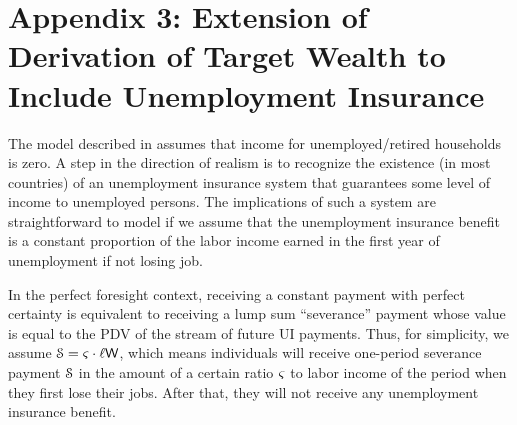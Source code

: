 

\section*{Appendix 3: Extension of Derivation of Target Wealth to Include Unemployment Insurance}

The model described in \cite{ctDiscrete} assumes that income for
unemployed/retired households is zero.  A step in the direction of
realism is to recognize the existence (in most countries) of an unemployment
insurance system that guarantees some level of income to unemployed
persons.  The implications of such a system are straightforward to
model if we assume that the unemployment insurance benefit is a
constant proportion of the labor income earned in the first year of unemployment if not losing job.

In the perfect foresight context, receiving a constant payment with
perfect certainty is equivalent to receiving a lump sum ``severance''
payment whose value is equal to the PDV of the stream of future UI
payments.  Thus, for simplicity, we assume
$\mathcal{S}=\varsigma\cdot\ell\mathsf{W}$, which means
individuals will receive one-period severance payment $\mathcal{S}$ in the amount of
a certain ratio $\varsigma$ to labor income of the period when they first lose their jobs. After that, they will not receive any unemployment
insurance benefit.

